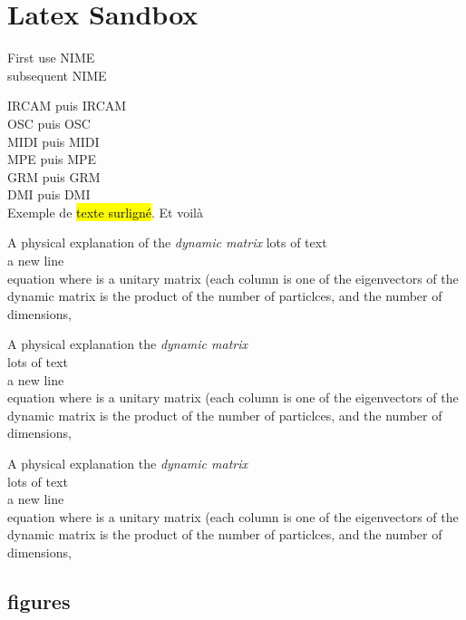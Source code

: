 %
\chapter{Latex Sandbox}
\label{ch:latex_sandbox}

First use \gls{NIME}\\
subsequent \gls{NIME}

\gls{IRCAM} puis \gls{IRCAM}\\
\gls{OSC} puis \gls{OSC}\\
\gls{MIDI} puis \gls{MIDI}\\
\gls{MPE} puis \gls{MPE}\\
\gls{GRM} puis \gls{GRM}\\
\gls{DMI} puis \gls{DMI}\\


Exemple de \hl{texte surligné}. Et voilà


\begin{titlebox}{A physical explanation of the \emph{dynamic matrix}}
lots of text\\
a new line\\
equation
where  is a unitary matrix (each column is one of the eigenvectors of the dynamic matrix is the product of the number of particlces, and the number of dimensions,
\end{titlebox}

\begin{notebox}
A physical explanation the \emph{dynamic matrix}\\
lots of text\\
a new line\\
equation
where  is a unitary matrix (each column is one of the eigenvectors of the dynamic matrix is the product of the number of particlces, and the number of dimensions,
\end{notebox}

\begin{notebox}
A physical explanation the \emph{dynamic matrix}\\
lots of text\\
a new line\\
equation
where  is a unitary matrix (each column is one of the eigenvectors of the dynamic matrix is the product of the number of particlces, and the number of dimensions,
\end{notebox}

\pierre{\blindtext}

\blindtext

\section*{figures}

